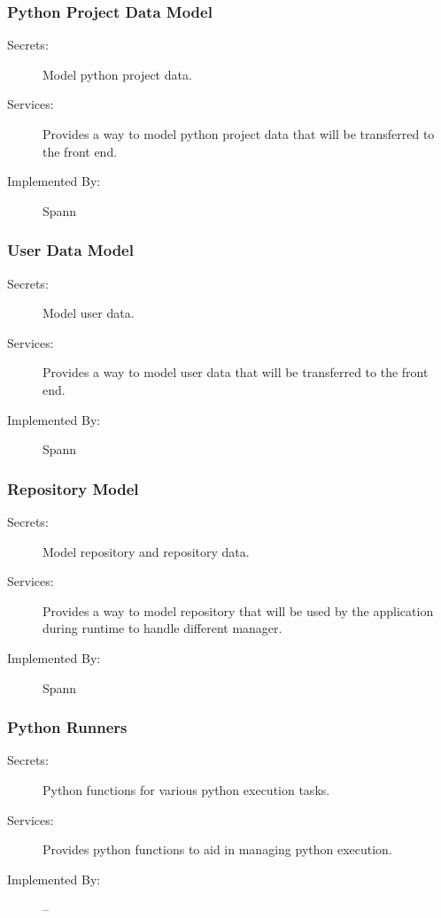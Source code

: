 \documentclass[12pt, titlepage]{article}
\begin{document}
\subsubsection{Python Project Data Model}

\begin{description}
\item[Secrets:] Model python project data.
\item[Services:] Provides a way to model python project data that will be transferred to the front end.
\item[Implemented By:] Spann
\end{description}

\subsubsection{User Data Model}

\begin{description}
\item[Secrets:] Model user data.
\item[Services:] Provides a way to model user data that will be transferred to the front end.
\item[Implemented By:] Spann
\end{description}


\subsubsection{Repository Model}

\begin{description}
\item[Secrets:] Model repository and repository data.
\item[Services:] Provides a way to model repository that will be used by the
    application during runtime to handle different manager.
\item[Implemented By:] Spann
\end{description}

\subsubsection{Python Runners}

\begin{description}
\item[Secrets:] Python functions for various python execution tasks.
\item[Services:] Provides python functions to aid in managing python execution.
\item[Implemented By:] --
\end{description}
\end{document}
